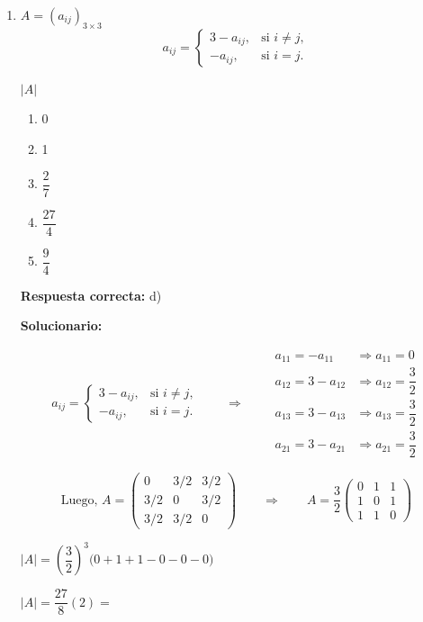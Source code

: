\begin{enumerate}[resume]
	\vspace{6mm}

	\item {}$ A = (a_{ij})_{3\times3}$ 
	\[
	a_{ij} =
	\begin{cases}
		3 - a_{ij}, & \text{si } i \neq j,\\[4pt]
		-a_{ij},    & \text{si } i = j.
	\end{cases}
	\]

	 $|A|$


	\begin{enumerate}[label=\alph*)]
		\item 0
		\item 1
		\item $\dfrac{2}{7}$
		\item $\dfrac{27}{4}$
		\item $\dfrac{9}{4}$
	\end{enumerate}
	\textbf{Respuesta correcta:} d)

	\vspace{2mm}
	\textbf{Solucionario:}

	\[
	a_{ij} =
	\begin{cases}
		3 - a_{ij}, & \text{si } i \neq j,\\[6pt]
		-a_{ij},    & \text{si } i = j.
	\end{cases}
	\qquad\Rightarrow\qquad
	\begin{aligned}
		a_{11} = -a_{11} &\Rightarrow a_{11} = 0 \\[6pt]
		a_{12} = 3 - a_{12} &\Rightarrow a_{12} = \dfrac{3}{2} \\[6pt]
		a_{13} = 3 - a_{13} &\Rightarrow a_{13} = \dfrac{3}{2} \\[6pt]
		a_{21} = 3 - a_{21} &\Rightarrow a_{21} = \dfrac{3}{2}
	\end{aligned}
	\]

	\[
	\text{Luego, }
	A =
	\begin{pmatrix}
		0 & 3/2 & 3/2 \\
		3/2 & 0 & 3/2 \\
		3/2 & 3/2 & 0
	\end{pmatrix}
	\qquad\Rightarrow\qquad
	A = \dfrac{3}{2}
	\begin{pmatrix}
		0 & 1 & 1 \\
		1 & 0 & 1 \\
		1 & 1 & 0
	\end{pmatrix}
	\]


	$|A|= \left(\dfrac{3}{2}\right)^3 \bigl(0 + 1 + 1 - 0 - 0 - 0\bigr)$



	$|A| = \dfrac{27}{8}(2)=$


\end{enumerate}



